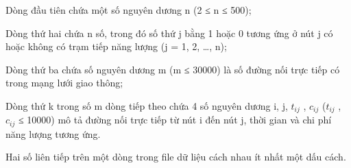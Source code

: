 Dòng đầu tiên chứa một số nguyên dương n (2 ≤ n ≤ 500);

Dòng thứ hai chứa n số, trong đó số thứ j bằng 1 hoặc 0 tương ứng ở nút j có hoặc không có trạm tiếp năng lượng (j = 1, 2, …, n);

Dòng thứ ba chứa số nguyên dương m (m ≤ 30000) là số đường nối trực tiếp có trong mạng lưới giao thông;

Dòng thứ k trong số m dòng tiếp theo chứa 4 số nguyên dương i, j, $t_{ij}$ , $c_{ij}$ ($t_{ij}$ , $c_{ij}$ ≤ 10000) mô tả đường nối trực tiếp từ nút i đến nút j, thời gian và chi phí năng lượng tương ứng.

Hai số liên tiếp trên một dòng trong file dữ liệu cách nhau ít nhất một dấu cách.